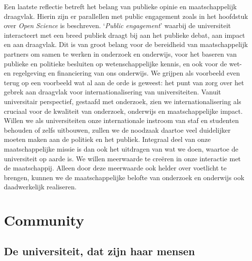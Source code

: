 \documentclass[smallauthor, chapterhaspagenum, nochapterinheader, pagenuminheader,  bigchapnum,medium2, tocpages, garamond, titleinheader]{jote-book}
\begin{document}
	Een laatste reflectie betreft het belang van publieke opinie en maatschappelijk draagvlak. Hierin zijn er parallellen met public engagement zoals in het hoofdstuk over \emph{Open }\emph{Science} is beschreven. ‘\emph{Public engagement}' waarbij de universiteit interacteert met een breed publiek draagt bij aan het publieke debat, aan impact en aan draagvlak. Dit is van groot belang voor de bereidheid van maatschappelijk partners om samen te werken in onderzoek en onderwijs, voor het baseren van publieke en politieke besluiten op wetenschappelijke kennis, en ook voor de wet- en regelgeving en financiering van ons onderwijs. We grijpen als voorbeeld even terug op een voorbeeld wat al aan de orde is geweest: het punt van zorg over het gebrek aan draagvlak voor internationalisering van universiteiten. Vanuit universitair perspectief, gestaafd met onderzoek, zien we internationalisering als cruciaal voor de kwaliteit van onderzoek, onderwijs en maatschappelijke impact. Willen we als universiteiten onze internationale instroom van staf en studenten behouden of zelfs uitbouwen, zullen we de noodzaak daartoe veel duidelijker moeten maken aan de politiek en het publiek. Integraal deel van onze maatschappelijke missie is dan ook het uitdragen van wat we doen, waartoe de universiteit op aarde is. We willen meerwaarde te creëren in onze interactie met de maatschappij. Alleen door deze meerwaarde ook helder over voetlicht te brengen, kunnen we de maatschappelijke belofte van onderzoek en onderwijs ook daadwerkelijk realiseren.







	\chapter{Community }



	\section{De universiteit, dat zijn haar mensen }
\end{document}
